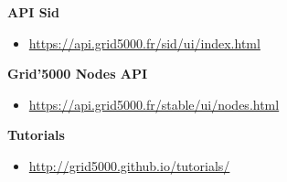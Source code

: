 \textbf{API Sid}
\begin{itemize}
\item \url{https://api.grid5000.fr/sid/ui/index.html}
\end{itemize}
\textbf{Grid'5000 Nodes API}
\begin{itemize}
\item \url{https://api.grid5000.fr/stable/ui/nodes.html}
\end{itemize}
\textbf{Tutorials}
\begin{itemize}
\item \url{http://grid5000.github.io/tutorials/}
\end{itemize}\vspace{-1.5em}%